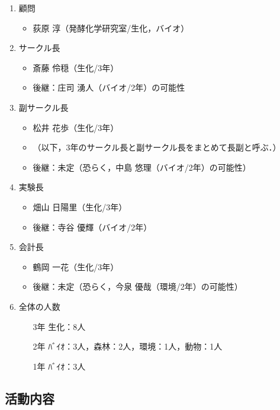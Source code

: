 \documentclass[a4paper,11pt]{ltjsarticle}
\begin{document}
\begin{enumerate}
    \item 顧問
    \begin{itemize}
        \item 荻原 淳（発酵化学研究室/生化，バイオ）
    \end{itemize}
    \item サークル長
    \begin{itemize}
        \item 斎藤 伶穏（生化/3年）
        \item 後継：庄司 湧人（バイオ/2年）の可能性
    \end{itemize}
    \item 副サークル長
    \begin{itemize}
        \item 松井 花歩（生化/3年）
        \item （以下，3年のサークル長と副サークル長をまとめて長副と呼ぶ．）
        \item 後継：未定（恐らく，中島 悠理（バイオ/2年）の可能性）
    \end{itemize}
    \item 実験長
    \begin{itemize}
        \item 畑山 日陽里（生化/3年）
        \item 後継：寺谷 優輝（バイオ/2年）
    \end{itemize}
    \item 会計長
    \begin{itemize}
        \item 鶴岡 一花（生化/3年）
        \item 後継：未定（恐らく，今泉 優哉（環境/2年）の可能性）
    \end{itemize}
    \item 全体の人数
    \begin{itemize}
        \item[3年] 生化：8人
        \item[2年] ﾊﾞｲｵ：3人，森林：2人，環境：1人，動物：1人
        \item[1年] ﾊﾞｲｵ：3人
    \end{itemize}
\end{enumerate}

\subsection{活動内容}
\end{document}
